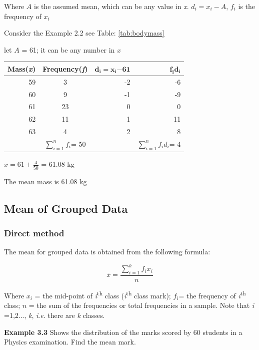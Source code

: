 \documentclass[
]{book}
\begin{document}
Where \(A\) is the assumed mean, which can be any value in \emph{x}.
\(d_{i} = x_{i} - A\), \(f_{i}\) is the frequency of \(x_{i}\)

Consider the Example 2.2 see Table: \ref{tab:bodymass}

let \(A\) = 61; it can be any number in \emph{x}

\begin{longtable}[]{@{}rcrr@{}}
\toprule
Mass(\emph{x}) & Frequency(\emph{f}) & \(\mathbf{d}_{\mathbf{i}}\mathbf{=}\mathbf{x}_{\mathbf{i}}\mathbf{-}\mathbf{61}\) & \(\mathbf{f}_{\mathbf{i}}\mathbf{d}_{\mathbf{i}}\) \\
\midrule
\endhead
59 & 3 & -2 & -6 \\
60 & 9 & -1 & -9 \\
61 & 23 & 0 & 0 \\
62 & 11 & 1 & 11 \\
63 & 4 & 2 & 8 \\
& \(\sum_{i = 1}^{n}f_{i}\)= 50 & & \(\sum_{i = 1}^{n}{f_{i}d_{i}}\)= 4 \\
\bottomrule
\end{longtable}

\(\overline{x} = 61 + \frac{4}{50}\) = 61.08 kg

The mean mass is 61.08 kg

\hypertarget{mean-of-grouped-data}{%
\subsection{Mean of Grouped Data}\label{mean-of-grouped-data}}

\hypertarget{direct-method-1}{%
\subsubsection{Direct method}\label{direct-method-1}}

The mean for grouped data is obtained from the following formula:

\[\overline{x} = \frac{\sum_{i = 1}^{k}{f_{i}x_{i}}}{n}\]

Where \(x_{i}\) = the mid-point of \emph{i}\textsuperscript{th} class (\emph{i}\textsuperscript{th} class mark);
\(f_{i}\)= the frequency of \emph{i}\textsuperscript{th} class; \(n\) = the sum of the
frequencies or total frequencies in a sample. Note that \emph{i} =1,2...,
\emph{k}, \emph{i}.\emph{e}. there are \emph{k} classes.

\textbf{Example 3.3} Shows the distribution of the marks scored by 60 students in a Physics examination. Find the mean mark.
\end{document}
